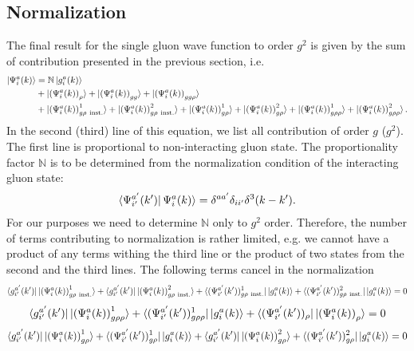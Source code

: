 \documentclass[10pt]{article}
\def\mf#1{\mathbb{#1}}
\numberwithin{equation}{section}
\begin{document}
\subsection{Normalization}
The final result for the single gluon wave function to order $g^2$ is given by the sum of contribution presented in the previous section, i.e. 
\begin{align}
  \ket{\Psi^{a}_{i}(k)}%
 & = \mf{N} \ket{ g_i^a(k) }%
 \\ \notag & + 
 \ket{ \left(\Psi^{a}_{i}(k) \right)_{\rho} }%
+\ket{ \left(\Psi^{a}_{i}(k) \right)_{gg} }%
+\ket{ \left(\Psi^{a}_{i}(k) \right)_{gg\rho} }%
\\ & +\ket{ \left(\Psi^{a}_{i}(k) \right)^{1}_{g \rho\ {\rm inst.} } }%
+\ket{ \left(\Psi^{a}_{i}(k) \right)^{2}_{g \rho\ {\rm inst.} } }%
+\ket{ \left(\Psi^{a}_{i}(k) \right)^{1}_{g \rho} }%
+\ket{ \left(\Psi^{a}_{i}(k) \right)^{2}_{g \rho} }%
+\ket{ \left(\Psi^{a}_{i}(k) \right)^{1}_{g\rho\rho} }%
+\ket{ \left(\Psi^{a}_{i}(k) \right)^{2}_{g\rho\rho} }. %
\label{Eq:intergluon}
\end{align}
In the second (third) line of this equation, we list all contribution of order $g$ ($g^2$). 
The first line is proportional to non-interacting gluon state. The proportionality factor  $\mf{N}$  is to be determined from the normalization 
condition of the interacting gluon state: 
\begin{align}
  \bra{\Psi^{a'}_{i'}(k')}%
  {\Psi^{a}_{i}(k)} \rangle%
  = \delta^{a a'} \delta_{i i'} \delta^{3}(k-k'). 
\end{align}
For our purposes we need to determine  $\mf{N}$ only to $g^2$ order. Therefore, the number of terms contributing to normalization is rather limited, 
e.g. we cannot have a product of any terms withing the third line or the product of two states from the second and the third lines. The following terms cancel in the normalization 
 $$  \bra{g^{a'}_{i'}(k')}\ket{ \left(\Psi^{a}_{i}(k) \right)^{1}_{g \rho\ {\rm inst.} } } + \bra{g^{a'}_{i'}(k')}\ket{ \left(\Psi^{a}_{i}(k) \right)^{2}_{g \rho\ {\rm inst.} } }+\bra{(\Psi^{a'}_{i'}(k'))^{1}_{g \rho\ {\rm inst.} } }\ket{g^{a}_{i}(k)} +\bra{(\Psi^{a'}_{i'}(k'))^{2}_{g \rho\ {\rm inst.} } }\ket{g^{a}_{i}(k)}  = 0 $$
 $$\bra{g^{a'}_{i'}(k')}\ket{ \left(\Psi^{a}_{i}(k) \right)^{1}_{g\rho\rho} }+ \bra{(\Psi^{a'}_{i'}(k'))^{1}_{g\rho\rho} }\ket{g^{a}_{i}(k)} + \bra{(\Psi^{a'}_{i'}(k'))_{\rho} }\ket{ \left(\Psi^{a}_{i}(k) \right)_{\rho} } = 0$$
 $$\bra{g^{a'}_{i'}(k')}\ket{ \left(\Psi^{a}_{i}(k) \right)^{1}_{g \rho} }+\bra{(\Psi^{a'}_{i'}(k'))^{1}_{g \rho} }\ket{g^{a}_{i}(k)} +\bra{g^{a'}_{i'}(k')}\ket{ \left(\Psi^{a}_{i}(k) \right)^{2}_{g \rho} }+\bra{(\Psi^{a'}_{i'}(k'))^{2}_{g \rho} }\ket{g^{a}_{i}(k)} = 0$$
\end{document}
